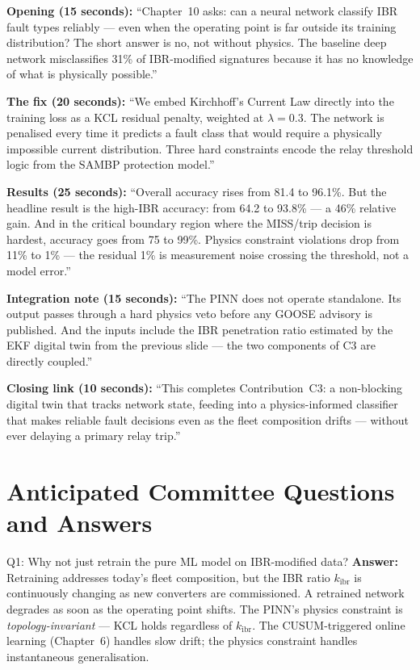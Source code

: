 \documentclass[12pt,a4paper]{article}
\newcommand{\kibr}{k_\mathrm{ibr}}
\begin{document}
\begin{speakbox}
\textbf{Opening (15 seconds):}
``Chapter~10 asks: can a neural network classify IBR fault types reliably — even when the operating point is far outside its training distribution? The short answer is no, not without physics. The baseline deep network misclassifies 31\% of IBR-modified signatures because it has no knowledge of what is physically possible.''

\medskip
\textbf{The fix (20 seconds):}
``We embed Kirchhoff's Current Law directly into the training loss as a KCL residual penalty, weighted at $\lambda = 0.3$. The network is penalised every time it predicts a fault class that would require a physically impossible current distribution. Three hard constraints encode the relay threshold logic from the SAMBP protection model.''

\medskip
\textbf{Results (25 seconds):}
``Overall accuracy rises from 81.4 to 96.1\%. But the headline result is the high-IBR accuracy: from 64.2 to 93.8\% — a 46\% relative gain. And in the critical boundary region where the MISS/trip decision is hardest, accuracy goes from 75 to 99\%. Physics constraint violations drop from 11\% to 1\% — the residual 1\% is measurement noise crossing the threshold, not a model error.''

\medskip
\textbf{Integration note (15 seconds):}
``The PINN does not operate standalone. Its output passes through a hard physics veto before any GOOSE advisory is published. And the inputs include the IBR penetration ratio estimated by the EKF digital twin from the previous slide — the two components of C3 are directly coupled.''

\medskip
\textbf{Closing link (10 seconds):}
``This completes Contribution~C3: a non-blocking digital twin that tracks network state, feeding into a physics-informed classifier that makes reliable fault decisions even as the fleet composition drifts — without ever delaying a primary relay trip.''
\end{speakbox}

\section{Anticipated Committee Questions and Answers}

\begin{keybox}{Q1: Why not just retrain the pure ML model on IBR-modified data?}
\textbf{Answer:} Retraining addresses today's fleet composition, but the IBR ratio $\kibr$ is continuously changing as new converters are commissioned. A retrained network degrades as soon as the operating point shifts. The PINN's physics constraint is \textit{topology-invariant} — KCL holds regardless of $\kibr$. The CUSUM-triggered online learning (Chapter~6) handles slow drift; the physics constraint handles instantaneous generalisation.
\end{keybox}
\end{document}
